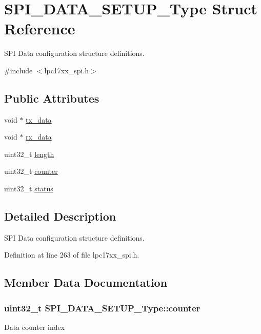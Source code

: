 \hypertarget{struct_s_p_i___d_a_t_a___s_e_t_u_p___type}{\section{\-S\-P\-I\-\_\-\-D\-A\-T\-A\-\_\-\-S\-E\-T\-U\-P\-\_\-\-Type \-Struct \-Reference}
\label{struct_s_p_i___d_a_t_a___s_e_t_u_p___type}
}


\-S\-P\-I \-Data configuration structure definitions.  




{\ttfamily \#include $<$lpc17xx\-\_\-spi.\-h$>$}

\subsection*{\-Public \-Attributes}
\begin{DoxyCompactItemize}
\item 
void $\ast$ \hyperlink{struct_s_p_i___d_a_t_a___s_e_t_u_p___type_a362d9e832e898541094e3b283d8bdb07}{tx\-\_\-data}
\item 
void $\ast$ \hyperlink{struct_s_p_i___d_a_t_a___s_e_t_u_p___type_a0d78da6af7beb33da640ae9f219bee4e}{rx\-\_\-data}
\item 
uint32\-\_\-t \hyperlink{struct_s_p_i___d_a_t_a___s_e_t_u_p___type_aaf73e8da65385c88a61e0c5f379a2276}{length}
\item 
uint32\-\_\-t \hyperlink{struct_s_p_i___d_a_t_a___s_e_t_u_p___type_a08b9c0a1c491f0740a94f6603e333f43}{counter}
\item 
uint32\-\_\-t \hyperlink{struct_s_p_i___d_a_t_a___s_e_t_u_p___type_a4daab7cdb918ff07a948c8f872ca6fa7}{status}
\end{DoxyCompactItemize}


\subsection{\-Detailed \-Description}
\-S\-P\-I \-Data configuration structure definitions. 

\-Definition at line 263 of file lpc17xx\-\_\-spi.\-h.



\subsection{\-Member \-Data \-Documentation}
\hypertarget{struct_s_p_i___d_a_t_a___s_e_t_u_p___type_a08b9c0a1c491f0740a94f6603e333f43}{
\subsubsection[{counter}]{\setlength{\rightskip}{0pt plus 5cm}uint32\-\_\-t {\bf \-S\-P\-I\-\_\-\-D\-A\-T\-A\-\_\-\-S\-E\-T\-U\-P\-\_\-\-Type\-::counter}}}\label{struct_s_p_i___d_a_t_a___s_e_t_u_p___type_a08b9c0a1c491f0740a94f6603e333f43}
\-Data counter index 

